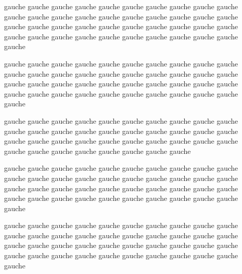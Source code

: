 \documentclass[12pt]{book}
\renewcommand{\edtext}[2]{}
\begin{document}
\begin{pages}
\begin{Leftside}
\begin{ledgroup}
gauche gauche gauche gauche gauche gauche gauche gauche gauche gauche gauche gauche gauche gauche gauche gauche gauche gauche gauche gauche gauche gauche gauche gauche gauche gauche gauche gauche gauche gauche gauche gauche gauche gauche gauche gauche gauche gauche gauche gauche gauche\edtext{gauche}{\Afootnote{gauche gauche gauche gauche gauche gauche gauche gauche gauche gauche gauche gauche gauche gauche gauche gauche gauche gauche gauche gauche gauche gauche gauche gauche gauche gauche gauche gauche gauche gauche gauche gauche gauche gauche gauche}}
\end{ledgroup}
\pend

\pstart
\begin{ledgroup}
gauche gauche gauche gauche gauche gauche gauche gauche gauche gauche gauche gauche gauche gauche gauche gauche gauche gauche gauche gauche gauche gauche gauche gauche gauche gauche gauche gauche gauche gauche gauche gauche gauche gauche gauche gauche gauche gauche gauche gauche gauche\edtext{gauche}{\Afootnote{gauche gauche gauche gauche gauche gauche gauche gauche gauche gauche gauche gauche gauche gauche gauche gauche gauche gauche gauche gauche gauche gauche gauche gauche gauche gauche gauche gauche gauche gauche gauche gauche gauche gauche gauche}}

gauche gauche gauche gauche gauche gauche gauche gauche gauche gauche gauche gauche gauche gauche gauche gauche gauche gauche gauche gauche gauche gauche gauche gauche gauche gauche gauche gauche gauche gauche gauche gauche gauche gauche gauche gauche gauche gauche\edtext{gauche}{\Afootnote{gauche gauche gauche gauche gauche gauche gauche gauche gauche gauche gauche gauche gauche gauche gauche gauche gauche gauche gauche gauche gauche gauche gauche gauche gauche gauche gauche gauche gauche gauche gauche gauche gauche gauche gauche}}
\end{ledgroup}
\pend
\pstart
\begin{ledgroup}
gauche gauche gauche gauche gauche gauche gauche gauche gauche gauche gauche gauche gauche gauche gauche gauche gauche gauche gauche gauche gauche gauche gauche gauche gauche gauche gauche gauche gauche gauche gauche gauche gauche gauche gauche gauche gauche gauche gauche gauche gauche\edtext{gauche}{\Afootnote{gauche gauche gauche gauche gauche gauche gauche gauche gauche gauche gauche gauche gauche gauche gauche gauche gauche gauche gauche gauche gauche gauche gauche gauche gauche gauche gauche gauche gauche gauche gauche gauche gauche gauche gauche }}

gauche gauche gauche gauche gauche gauche gauche gauche gauche gauche gauche gauche gauche gauche gauche gauche gauche gauche gauche gauche gauche gauche gauche gauche gauche gauche gauche gauche gauche gauche gauche gauche gauche gauche gauche gauche gauche gauche gauche gauche gauche\edtext{gauche}{\Afootnote{gauche gauche gauche gauche gauche gauche gauche gauche gauche gauche gauche gauche gauche gauche gauche gauche gauche gauche gauche gauche gauche gauche gauche gauche gauche gauche gauche gauche gauche gauche gauche gauche gauche gauche gauche }}
\end{ledgroup}
\pend


\end{Leftside}
\end{pages}
\end{document}
